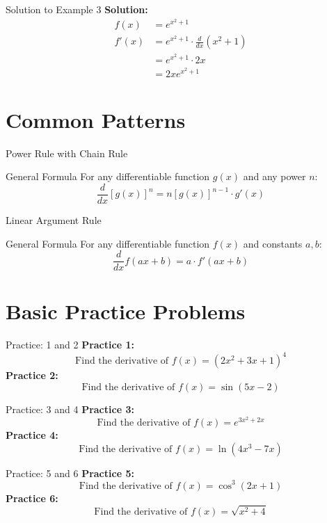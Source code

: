 \documentclass[aspectratio=169]{beamer}
\begin{document}
\begin{frame}{Solution to Example 3}
\textbf{Solution:}
\[
\begin{aligned}
  f(x) &= e^{x^2 + 1} \\
  f'(x) &= e^{x^2 + 1} \cdot \frac{d}{dx}(x^2 + 1) \\
  &= e^{x^2 + 1} \cdot 2x \\
  &= 2xe^{x^2 + 1}
\end{aligned}
\]
\end{frame}

\section{Common Patterns}

\begin{frame}{Power Rule with Chain Rule}
\begin{block}{General Formula}
For any differentiable function $g(x)$ and any power $n$:
\[\frac{d}{dx}[g(x)]^n = n[g(x)]^{n-1} \cdot g'(x)\]
\end{block}
\end{frame}

\begin{frame}{Linear Argument Rule}
\begin{block}{General Formula}
For any differentiable function $f(x)$ and constants $a, b$:
\[\frac{d}{dx}f(ax + b) = a \cdot f'(ax + b)\]
\end{block}
\end{frame}

\section{Basic Practice Problems}

\begin{frame}{Practice: 1 and 2}
\textbf{Practice 1:}
\[
\text{Find the derivative of } f(x) = (2x^2 + 3x + 1)^4
\]
\vspace{1em}
\textbf{Practice 2:}
\[
\text{Find the derivative of } f(x) = \sin(5x - 2)
\]
\end{frame}

\begin{frame}{Practice: 3 and 4}
\textbf{Practice 3:}
\[
\text{Find the derivative of } f(x) = e^{3x^2 + 2x}
\]
\vspace{1em}
\textbf{Practice 4:}
\[
\text{Find the derivative of } f(x) = \ln(4x^3 - 7x)
\]
\end{frame}

\begin{frame}{Practice: 5 and 6}
\textbf{Practice 5:}
\[
\text{Find the derivative of } f(x) = \cos^3(2x + 1)
\]
\vspace{1em}
\textbf{Practice 6:}
\[
\text{Find the derivative of } f(x) = \sqrt{x^2 + 4}
\]
\end{frame}
\end{document}
